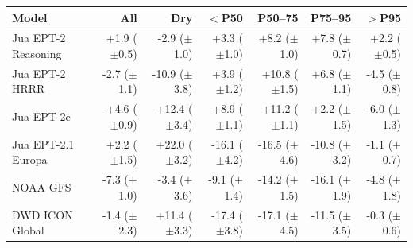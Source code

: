 \begin{tabular}{lrrrrrr}
\toprule
Model & All & Dry & $<$P50 & P50--75 & P75--95 & $>$P95 \\
\midrule
Jua EPT-2 Reasoning & +1.9 ($\pm$0.5) & -2.9 ($\pm$1.0) & +3.3 ($\pm$1.0) & +8.2 ($\pm$1.0) & +7.8 ($\pm$0.7) & +2.2 ($\pm$0.5) \\
Jua EPT-2 HRRR & -2.7 ($\pm$1.1) & -10.9 ($\pm$3.8) & +3.9 ($\pm$1.2) & +10.8 ($\pm$1.5) & +6.8 ($\pm$1.1) & -4.5 ($\pm$0.8) \\
Jua EPT-2e & +4.6 ($\pm$0.9) & +12.4 ($\pm$3.4) & +8.9 ($\pm$1.1) & +11.2 ($\pm$1.1) & +2.2 ($\pm$1.5) & -6.0 ($\pm$1.3) \\
Jua EPT-2.1 Europa & +2.2 ($\pm$1.5) & +22.0 ($\pm$3.2) & -16.1 ($\pm$4.2) & -16.5 ($\pm$4.6) & -10.8 ($\pm$3.2) & -1.1 ($\pm$0.7) \\
NOAA GFS & -7.3 ($\pm$1.0) & -3.4 ($\pm$3.6) & -9.1 ($\pm$1.4) & -14.2 ($\pm$1.5) & -16.1 ($\pm$1.9) & -4.8 ($\pm$1.8) \\
DWD ICON Global & -1.4 ($\pm$2.3) & +11.4 ($\pm$3.3) & -17.4 ($\pm$3.8) & -17.1 ($\pm$4.5) & -11.5 ($\pm$3.5) & -0.3 ($\pm$0.6) \\
\bottomrule
\end{tabular}
